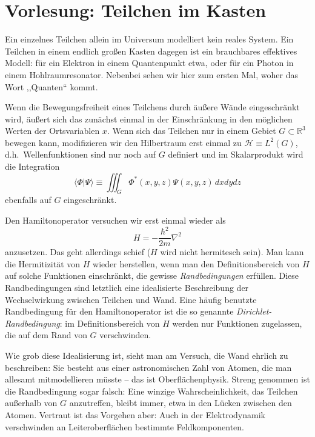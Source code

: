 
\section{Vorlesung: Teilchen im Kasten}
Ein einzelnes Teilchen allein im Universum modelliert kein reales System. Ein Teilchen in einem endlich großen Kasten dagegen ist ein brauchbares effektives Modell: für ein Elektron in einem Quantenpunkt etwa, oder für ein Photon in einem Hohlraumresonator. Nebenbei sehen wir hier zum ersten Mal, woher das Wort ,,Quanten`` kommt.

Wenn die Bewegungsfreiheit eines Teilchens durch äußere Wände eingeschränkt wird, äußert sich das zunächst einmal in der Einschränkung in den möglichen Werten der Ortsvariablen $x$. Wenn sich das Teilchen nur in einem Gebiet $G \subset \mathbb{R}^3$ bewegen kann, modifizieren wir den Hilbertraum erst einmal zu $\mathcal{H}\equiv L^2(G)$, d.h.\ Wellenfunktionen sind nur noch auf $G$ definiert und im
Skalarprodukt wird die Integration 
\begin{equation}
	\langle \Phi|\Psi\rangle \equiv \iiint_G \Phi^*(x,y,z)\Psi(x,y,z)\, dxdydz
\end{equation}
ebenfalls auf $G$ eingeschränkt. 

Den Hamiltonoperator versuchen wir erst einmal wieder als 
\begin{equation}
	H = -\frac{\hbar^2}{2m}\nabla^2
\end{equation}
anzusetzen. Das geht allerdings schief ($H$ wird nicht hermitesch sein). Man kann die Hermitizität von $H$ wieder herstellen, wenn man den Definitionsbereich von $H$ auf solche Funktionen einschränkt, die gewisse \emph{Randbedingungen} erfüllen. Diese Randbedingungen sind letztlich eine idealisierte Beschreibung der Wechselwirkung zwischen Teilchen und Wand. Eine häufig benutzte Randbedingung für den Hamiltonoperator ist die so genannte \emph{Dirichlet-Randbedingung}: im Definitionsbereich von $H$ werden nur Funktionen zugelassen, die auf dem Rand von $G$ verschwinden.

Wie grob diese Idealisierung ist, sieht man am Versuch, die Wand ehrlich zu beschreiben: Sie besteht aus einer astronomischen Zahl von Atomen, die man allesamt mitmodellieren müsste -- das ist Oberflächenphysik. Streng genommen ist die Randbedingung sogar falsch: Eine winzige Wahrscheinlichkeit, das Teilchen außerhalb von $G$ anzutreffen, bleibt immer, etwa in den Lücken zwischen den Atomen. Vertraut ist das Vorgehen aber: Auch in der Elektrodynamik verschwinden an Leiteroberflächen bestimmte Feldkomponenten.

